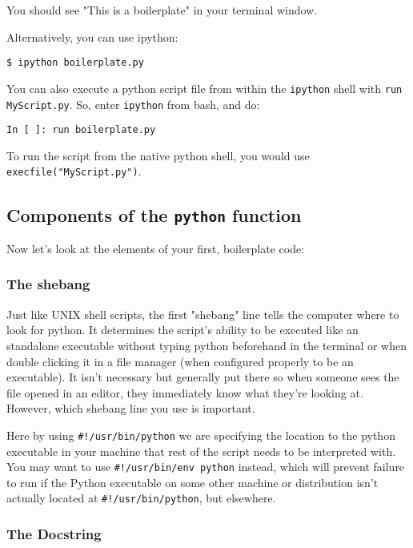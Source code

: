 You should see "This is a boilerplate" in your terminal window. 

Alternatively, you can use ipython:
\begin{lstlisting} 
$ ipython boilerplate.py
\end{lstlisting}

You can also execute a python script file from within the {\tt ipython} 
shell with {\tt run MyScript.py}. So, enter {\tt ipython} from bash, 
and do: 
\begin{lstlisting} 
In [ ]: run boilerplate.py
\end{lstlisting}

To run the script from the native python shell, you would use {\tt 
execfile("MyScript.py")}.

\subsection{Components of the {\tt python} function}

Now let's look at the elements of your first, boilerplate code:

\subsubsection{The shebang}

Just like UNIX shell scripts, the first "shebang" line tells the 
computer where to look for python. It determines the script's ability 
to be executed like an standalone executable without typing python 
beforehand in the terminal or when double clicking it in a file 
manager (when configured properly to be an executable). It isn't 
necessary but generally put there so when someone sees the file opened 
in an editor, they immediately know what they're looking at. However, 
which shebang line you use is important. 

Here by using {\tt \#!/usr/bin/python} we are specifying the location 
to the python executable in your machine that rest of the script needs 
to be interpreted with. You may want to use {\tt \#!/usr/bin/env 
python} instead, which will prevent failure to run if the Python 
executable on some other machine or distribution isn't actually located 
at {\tt \#!/usr/bin/python}, but elsewhere.

\subsubsection{The Docstring}

